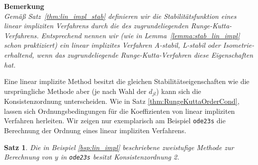\documentclass[12pt,a4paper]{book}
\theoremstyle{break}
\newtheorem{theorem}{Satz}[chapter]
\theoremstyle{nonumberplain}
\newcommand{\1}{\mathbbm{1}} 			      	%
\begin{document}
\textbf{Bemerkung}\\
{\it Gemäß Satz~\ref{thm:lin_impl_stab} definieren wir die Stabilitätsfunktion eines
linear impliziten Verfahrens durch die des zugrundeliegenden Runge-Kutta-Verfahrens. Entsprechend nennen wir (wie in Lemma~\ref{lemma:stab_lin_impl} schon praktiziert) 
ein linear implizites Verfahren A-stabil, L-stabil oder Isometrie-erhaltend, wenn das 
zugrundeliegende Runge-Kutta-Verfahren diese Eigenschaften hat.}

Eine linear implizite Method besitzt die gleichen Stabilitätseigenschaften wie die ursprüngliche Methode aber (je nach Wahl der $d_{jl}$) kann sich die Konsistenzordnung unterscheiden. Wie in Satz \ref{thm:RungeKuttaOrderCond}, lassen sich Ordnungsbedingungen für die Koeffizienten von linear impliziten Verfahren herleiten. 
Wir zeigen nur exemplarisch am Beispiel \verb.ode23s. die Berechnung der Ordnung eines linear impliziten Verfahrens.

\begin{theorem}
Die in Beispiel \ref{bsp:lin_impl} beschriebene zweistufige Methode zur Berechnung von $y$ in \verb.ode23s. besitzt Konsistenzordnung 2.
\end{theorem}
\end{document}
